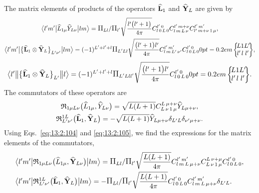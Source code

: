 The matrix elements of products of the operators \(\widehat{\mathbf{L}}_{1}\) and \(\widehat{\mathbf{Y}}_{L}\) are given by
\begin{gather}
\braOket{l^{\prime} m^{\prime}}{\widehat{L}_{1 \mu} \widehat{Y}_{L \nu}}{ l m}=\Fact{L l}/\Fact{l^\prime}\sqrt{\frac{ l^{\prime}\bigl(l^{\prime}+1\bigr)}{4 \pi}} 
\clebsch{l}{0}{L}{0}{l^{\prime}}{0} 
\clebsch{l}{m}{L}{\nu}{l^{\prime}}{m+\nu} 
\clebsch{l^{\prime}}{m+\nu}{1}{\mu}{l^{\prime}}{m^{\prime}},  \label{eq:13:2:116}\\
\braOket{ l^{\prime} m^{\prime}}{\bigl\{\widehat{\vect{L}}_{1} \otimes \widehat{\vect{Y}}_{L}\bigr\}_{L^{\prime} \nu^{\prime}}}{l m}=(-1)^{L^{\prime}+l^{\prime}+l} \Fact{L^\prime L l}\sqrt{\frac{\bigl(l^{\prime}+1\bigr) l^{\prime}}{4 \pi}} 
\clebsch{l}{m}{L^{\prime}}{\nu^{\prime}}{l^{\prime}}{m^{\prime}} 
\clebsch{l}{0}{L}{0}{l^{\prime}}{0}
\sixj{L}{1}{L^{\prime}}{l^{\prime}}{l}{l^{\prime}}, \label{eq:13:2:117}
\end{gather}
\begin{equation*}
\braOketred{ l^{\prime}}{\bigl\{\widehat{\vect{L}}_{1} \otimes \widehat{\vect{Y}}_{L}\bigr\}_{L^{\prime}}}{ l}=(-1)^{L^{\prime}+l^{\prime}+l} \Fact{L^\prime L l l^{\prime}}\sqrt{\frac{\bigl(l^{\prime}+1\bigr) l^{\prime}}{4 \pi}}
\clebsch{l}{0}{L}{0}{l^{\prime}}{0}
\sixj{L}{1}{L^{\prime}}{l^{\prime}}{l}{l^{\prime}}.
\end{equation*}
The commutators of these operators are
\begin{gather}
\mathfrak{R}_{1 \mu L \nu}\bigl(\widehat{L}_{1 \mu}, \widehat{Y}_{L \nu}\bigr)=\sqrt{L(L+1)} C_{L\,\nu\,1\,\mu}^{L\,\mu+\nu} \widehat{Y}_{L \mu+\nu},  \label{eq:13:2:118}\\
\mathfrak{R}_{L^{\prime} \nu^{\prime}}^{1 L}\bigl(\widehat{\mathbf{L}}_{1}, \widehat{\mathbf{Y}}_{L}\bigr)=-\sqrt{L(L+1)} \widehat{Y}_{L \mu+\nu} \delta_{L^{\prime} L} \delta_{\nu^{\prime} \mu+\nu}. \label{eq:13:2:119}
\end{gather}
Using Eqs.~\eqref{eq:13:2:104} and \eqref{eq:13:2:105}, we find the expressions for the matrix elements of the commutators,
\begin{align}
& 
\braOket{ l^{\prime} m^{\prime}}{ \mathfrak{R}_{1 \mu L \nu}\bigl(\widehat{L}_{1 \mu}, \widehat{\vect{Y}}_{L \nu}\bigr)}{l m}=\Fact{L l}/\Fact{l^\prime}\sqrt{\frac{L(L+1)}{4 \pi}} 
\clebsch{l}{m}{L}{\mu+\nu}{l^{\prime}}{m^{\prime}} 
\clebsch{L}{\nu}{1}{\mu}{L}{\nu+\mu} 
\clebsch{l}{0}{L}{0}{l^{\prime}}{0},  \label{eq:13:2:120}\\
& 
\braOket{ l^{\prime} m^{\prime}}{ \mathfrak{R}_{L^{\prime} \nu^{\prime}}^{1 L}\bigl(\widehat{\vect{L}}_{1}, \widehat{\vect{Y}}_{L}\bigr)}{l m}=-\Fact{L l}/\Fact{l^\prime}\sqrt{\frac{L(L+1)}{4 \pi}}
\clebsch{l}{0}{L}{0}{l^{\prime}}{0} 
\clebsch{l}{m}{L}{\mu+\nu}{l^{\prime}}{m^{\prime}} \delta_{L^{\prime} L}. \label{eq:13:2:121}
\end{align}
